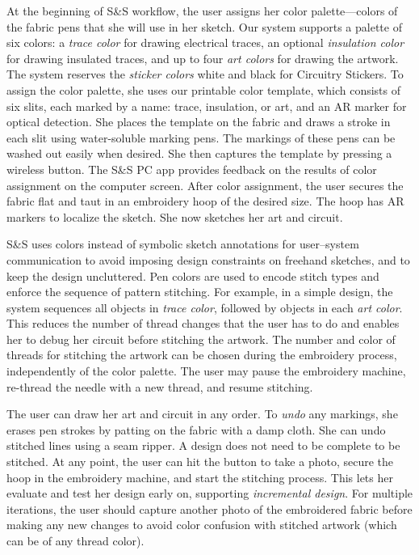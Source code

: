 \documentclass[header.tex]{subfiles}
\begin{document}
At the beginning of S\&S workflow, the user assigns her color palette---colors of the fabric pens that she will use in her sketch. Our system supports a palette of six colors: a \textit{trace color} for drawing electrical traces, an optional \textit{insulation color} for drawing insulated traces, and up to four \textit{art colors} for drawing the artwork. The system reserves the \textit{sticker colors} white and black for Circuitry Stickers. To assign the color palette, she uses our printable color template, which consists of six slits, each marked by a name: trace, insulation, or art, and an AR marker for optical detection. She places the template on the fabric and draws a stroke in each slit using water-soluble marking pens. The markings of these pens can be washed out easily when desired. She then captures the template by pressing a wireless button. The S\&S PC app provides feedback on the results of color assignment on the computer screen. After color assignment, the user secures the fabric flat and taut in an embroidery hoop of the desired size. The hoop has AR markers to localize the sketch. She now sketches her art and circuit.

S\&S uses colors instead of symbolic sketch annotations for user--system communication to avoid imposing design constraints on freehand sketches, and to keep the design uncluttered. Pen colors are used to encode stitch types and enforce the sequence of pattern stitching. For example, in a simple design, the system sequences all objects in \textit{trace color}, followed by objects in each \textit{art color}. This reduces the number of thread changes that the user has to do and enables her to debug her circuit before stitching the artwork. %
The number and color of threads for stitching the artwork can be chosen during the embroidery process, independently of the color palette. The user may pause the embroidery machine, re-thread the needle with a new thread, and resume stitching. %


The user can draw her art and circuit in any order.
To \textit{undo} any markings, she erases pen strokes by patting on the fabric with a damp cloth. She can undo stitched lines using a seam ripper. A design does not need to be complete to be stitched. At any point, the user can hit the button to take a photo, secure the hoop in the embroidery machine, and start the stitching process. This lets her evaluate and test her design early on, supporting \textit{incremental design}. For multiple iterations, the user should capture another photo of the embroidered fabric before making any new changes to avoid color confusion with stitched artwork (which can be of any thread color).
\end{document}
